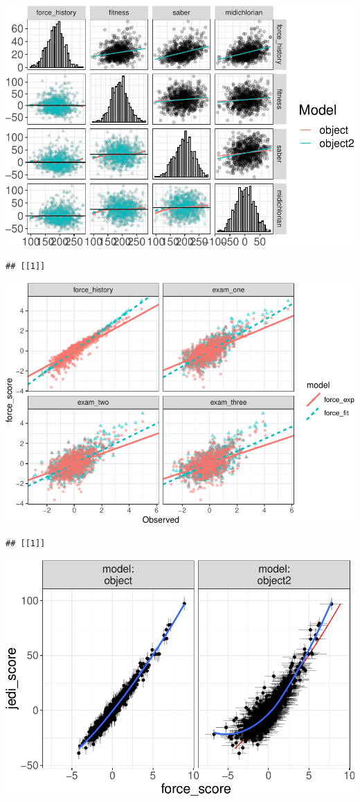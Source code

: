 \documentclass[
  english,
  doc]{apa6}
\begin{document}
\includegraphics{flexplavaan_draft_files/figure-latex/unnamed-chunk-2-1.pdf}

\begin{verbatim}
## [[1]]
\end{verbatim}

\includegraphics{flexplavaan_draft_files/figure-latex/unnamed-chunk-3-1.pdf}

\begin{verbatim}
## [[1]]
\end{verbatim}

\includegraphics{flexplavaan_draft_files/figure-latex/unnamed-chunk-4-1.pdf}
\end{document}
